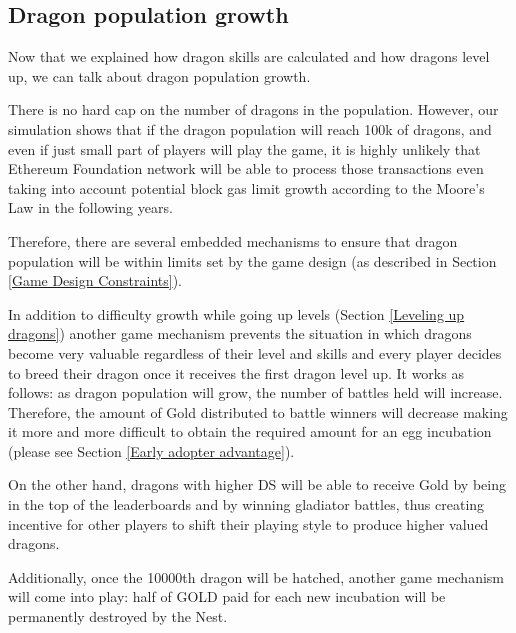 \documentclass[12pt]{article}
\begin{document}
{ %
 
 \setlength{\parskip}{9.96pt}
 \subsection{Dragon population growth}
 \label{Dragon population growth}   \par

Now that we explained how dragon skills are calculated and how dragons level up, we can talk about dragon population growth.\par

There is no hard cap on the number of dragons in the population. However, our simulation shows that if the dragon population will reach 100k of dragons, and even if just small part of players will play the game, it is highly unlikely that Ethereum Foundation network will be able to process those transactions even taking into account potential block gas limit growth according to the Moore's Law in the following years.\par

Therefore, there are several embedded mechanisms to ensure that dragon population will be within limits set by the game design (as described in Section \ref{Game Design Constraints}).\par

In addition to difficulty growth while going up levels (Section \ref{Leveling up dragons}) another game mechanism prevents the situation in which dragons become very valuable regardless of their level and skills and every player decides to breed their dragon once it receives the first dragon level up. It works as follows: as dragon population will grow, the number of battles held will increase. Therefore, the amount of Gold distributed to battle winners will decrease making it more and more difficult to obtain the required amount for an egg incubation (please see Section \ref{Early adopter advantage}).\par

On the other hand, dragons with higher DS\textit{ }will be able to receive Gold by being in the top of the leaderboards and by winning gladiator battles, thus creating incentive for other players to shift their playing style to produce higher valued dragons.\par

Additionally, once the 10000th dragon will be hatched, another game mechanism will come into play: half of GOLD paid for each new incubation will be permanently destroyed by the Nest.\par

}
\end{document}
